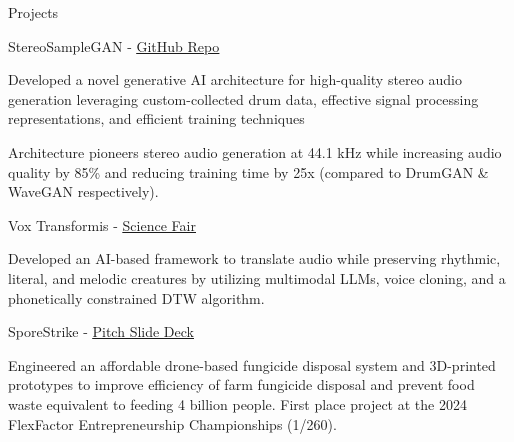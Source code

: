 \documentclass[
  11pt, %
]{resume}
\begin{document}

\begin{rSection}{Projects}

  
    \begin{rSubsection}{StereoSampleGAN - \underline{\href{https://github.com/shuklabhay/stereo-sample-gan}{GitHub Repo}}}{}{}{}
        
      \item Developed a novel generative AI architecture for high-quality stereo audio generation leveraging custom-collected drum data, effective signal processing representations, and efficient training techniques
          
      \item Architecture pioneers stereo audio generation at 44.1 kHz while increasing audio quality by 85\% and reducing training time by 25x (compared to DrumGAN \& WaveGAN respectively).
          
    \end{rSubsection}
        
    \begin{rSubsection}{Vox Transformis - \underline{\href{https://science-fair.org/}{Science Fair}}}{}{}{}
        
      \item Developed an AI-based framework to translate audio while preserving rhythmic, literal, and melodic creatures by utilizing multimodal LLMs, voice cloning, and a phonetically constrained DTW algorithm.
          
    \end{rSubsection}
        
    \begin{rSubsection}{SporeStrike - \underline{\href{https://shuklabhay.github.io/static/projects/sporestrike/FlexFactor_SporeStrike_pitch.pdf}{Pitch Slide Deck}}}{}{}{}
        
      \item Engineered an affordable drone-based fungicide disposal system and 3D-printed prototypes to improve efficiency of farm fungicide disposal and prevent food waste equivalent to feeding 4 billion people. First place project at the 2024 FlexFactor Entrepreneurship Championships (1/260).
          
    \end{rSubsection}
        
\end{rSection}
    
\end{document}
